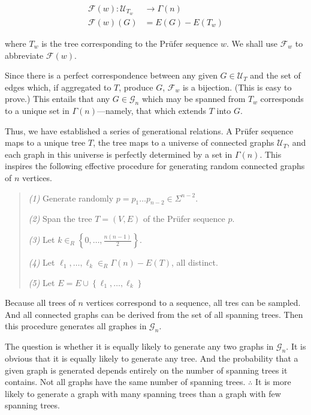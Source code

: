 \documentclass[a4paper, 12pt]{article}
\begin{document}
\begin{align*}
    \mathcal{F}(w) : \mathcal{U}_{T_w} &\to \Gamma(n)  \\ 
    \mathcal{F}(w)(G) &= E(G) - E(T_w)
\end{align*}

where $T_w$ is the tree corresponding to the Prüfer sequence $w$. We shall use
$\mathcal{F}_w$ to abbreviate $\mathcal{F}(w)$.

Since there is a perfect correspondence between any given $G \in \mathcal{U}_T$ and the
set of edges which, if aggregated to $T$, produce $G$, $\mathcal{F}_w$ is a
bijection. (This is easy to prove.) This entails that any $G \in \mathcal{G}_n$
which may be spanned from $T_w$ corresponds to a unique set in
$\Gamma(n)$---namely, that which extends $T$ into $G$.

Thus, we have established a series of generational relations. A Prüfer sequence
maps to a unique tree $T$, the tree maps to a universe of connected graphs
$\mathcal{U}_T$, and each graph in this universe is perfectly determined by a
set in $\Gamma(n)$. This inspires the following effective procedure for
generating random connected graphs of $n$ vertices.

\begin{quote}
    \textit{(1)} Generate randomly $p = p_1\ldots p_{n-2} \in \Sigma^{n-2}$.

    \textit{(2)} Span the tree $T = (V, E)$ of the Prüfer sequence $p$.

    \textit{(3)} Let $k \in_R \left\{ 0, \ldots, \frac{ n(n-1) }{2} \right\} $.

    \textit{(4)} Let $\ell_1, \ldots, \ell_k \in_R \Gamma(n) - E(T)$, all distinct.

    \textit{(5)} Let $E = E \cup \left\{ \ell_1,\ldots, \ell_k \right\} $
\end{quote}

Because all trees of $n$ vertices correspond to a sequence, all tres can be
sampled. And all connected graphs can be derived from the set of all spanning
trees. Then this procedure generates all graphes in $\mathcal{G}_n$.

The question is whether it is equally likely to generate any two graphs in
$\mathcal{G}_n$. It is obvious that it is equally likely to generate any tree.
And the probability that a given graph is generated depends entirely on the
number of spanning trees it contains. Not all graphs have the same number of
spanning trees. $\therefore $ It is more likely to generate a graph with many
spanning trees than a graph with few spanning trees.
\end{document}
